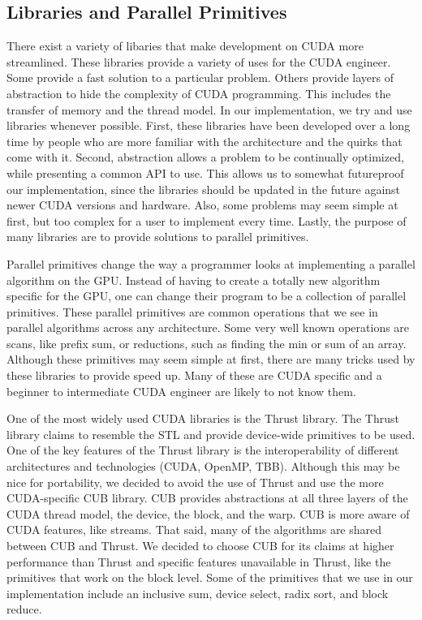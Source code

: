 \subsection{Libraries and Parallel Primitives}
\label{sec:primitives}

There exist a variety of libaries that make development on CUDA more streamlined.
These libraries provide a variety of uses for the CUDA engineer.
Some provide a fast solution to a particular problem.
Others provide layers of abstraction to hide the complexity of CUDA programming.
This includes the transfer of memory and the thread model.
In our implementation, we try and use libraries whenever possible.
First, these libraries have been developed over a long time by people who are more familiar with the architecture and the quirks that come with it.
Second, abstraction allows a problem to be continually optimized, while presenting a common API to use.
This allows us to somewhat futureproof our implementation, since the libraries should be updated in the future against newer CUDA versions and hardware.
Also, some problems may seem simple at first, but too complex for a user to implement every time.
Lastly, the purpose of many libraries are to provide solutions to parallel primitives.

Parallel primitives change the way a programmer looks at implementing a parallel algorithm on the GPU.
Instead of having to create a totally new algorithm specific for the GPU, one can change their program to be a collection of parallel primitives.
These parallel primitives are common operations that we see in parallel algorithms across any architecture.
Some very well known operations are scans, like prefix sum, or reductions, such as finding the min or sum of an array.
Although these primitives may seem simple at first, there are many tricks used by these libraries to provide speed up.
Many of these are CUDA specific and a beginner to intermediate CUDA engineer are likely to not know them.

One of the most widely used CUDA libraries is the Thrust library.
The Thrust library claims to resemble the STL and provide device-wide primitives to be used.
One of the key features of the Thrust library is the interoperability of different architectures and technologies (CUDA, OpenMP, TBB).
Although this may be nice for portability, we decided to avoid the use of Thrust and use the more CUDA-specific CUB library.
CUB provides abstractions at all three layers of the CUDA thread model, the device, the block, and the warp.
CUB is more aware of CUDA features, like streams.
That said, many of the algorithms are shared between CUB and Thrust.
We decided to choose CUB for its claims at higher performance than Thrust and specific features unavailable in Thrust, like the primitives that work on the block level.
Some of the primitives that we use in our implementation include an inclusive sum, device select, radix sort, and block reduce.

